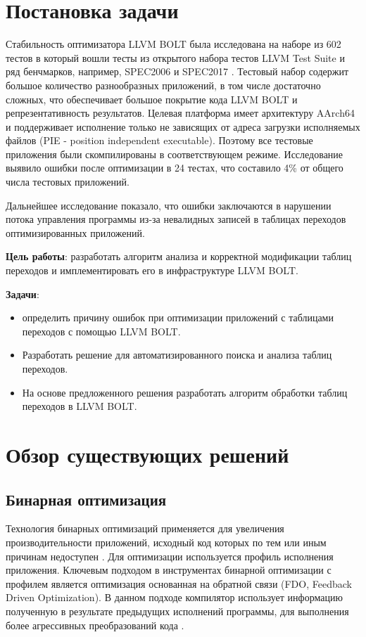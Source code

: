\documentclass{mipt-thesis-bs}
\begin{document}
    \chapter{Постановка задачи}

    Стабильность оптимизатора LLVM BOLT была исследована на наборе из 602 тестов в который вошли тесты из открытого набора тестов LLVM Test Suite и ряд бенчмарков, например, SPEC2006 и SPEC2017 \cite{specs}. Тестовый набор содержит большое количество разнообразных приложений, в том числе достаточно сложных, что обеспечивает большое покрытие кода LLVM BOLT и репрезентативность результатов. Целевая платформа имеет архитектуру AArch64 и поддерживает исполнение только не зависящих от адреса загрузки исполняемых файлов (PIE - position independent executable). Поэтому все тестовые приложения были скомпилированы в соответствующем режиме. Исследование выявило ошибки после оптимизации в 24 тестах, что составило 4\% от общего числа тестовых приложений.

    Дальнейшее исследование показало, что ошибки заключаются в нарушении потока управления программы из-за невалидных записей в таблицах переходов оптимизированных приложений.

    \textbf{Цель работы}: разработать алгоритм анализа и корректной модификации таблиц переходов и имплементировать его в инфраструктуре LLVM BOLT.

    \textbf{Задачи}:
    \begin{itemize}
        \item определить причину ошибок при оптимизации приложений с таблицами переходов с помощью LLVM BOLT.
        \item Разработать решение для автоматизированного поиска и анализа таблиц переходов.
        \item На основе предложенного решения разработать алгоритм обработки таблиц переходов в LLVM BOLT.
    \end{itemize}

    \chapter{Обзор существующих решений}

    \section{Бинарная оптимизация}
    Технология бинарных оптимизаций применяется для увеличения производительности приложений, исходный код которых по тем или иным причинам недоступен \cite{lisitsyn-disser}. Для оптимизации используется профиль исполнения приложения. Ключевым подходом в инструментах бинарной оптимизации с профилем является оптимизация основанная на обратной связи (FDO, Feedback Driven Optimization). В данном подходе компилятор использует информацию полученную в результате предыдущих исполнений программы, для выполнения более агрессивных преобразований кода \cite{auto-fdo}.
\end{document}
